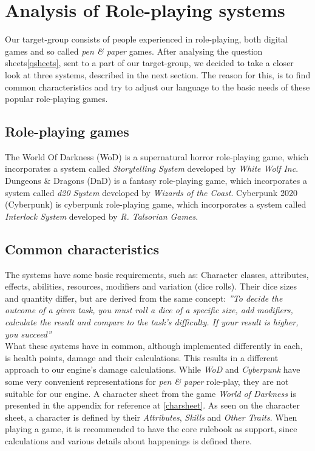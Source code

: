 \section{Analysis of Role-playing systems}
Our target-group consists of people experienced in role-playing, both digital games and so called \emph{pen \& paper} games.	After analysing the question sheets\vref{qsheets}, sent to a part of our target-group, we decided to take a closer look at three systems, described in the next section. The reason for this, is to find common characteristics and try to adjust our language to the basic needs of these popular role-playing games.

\subsection*{Role-playing games}
The World Of Darkness (WoD) is a supernatural horror role-playing game, which incorporates a system called \emph{Storytelling System} developed by \emph{White Wolf Inc}.\cite{wod}
Dungeons \& Dragons (DnD) is a fantasy role-playing game, which incorporates a system called \emph{d20 System} developed by \emph{Wizards of the Coast}.\cite{dnd}
Cyberpunk 2020 (Cyberpunk) is cyberpunk role-playing game, which incorporates a system called \emph{Interlock System} developed by \emph{R. Talsorian Games}.\cite{cyberpunk}

\subsection*{Common characteristics}
\label{baseclasses}
The systems have some basic requirements, such as:
Character classes, attributes, effects, abilities, resources, modifiers and variation (dice rolls).
Their dice sizes and quantity differ, but are derived from the same concept: \textit{''To decide the outcome of a given task, you must roll a dice of a specific size, add modifiers, calculate the result and compare to the task's difficulty. If your result is higher, you succeed''}\\

What these systems have in common, although implemented differently in each, is health points, damage and their calculations. This results in a different approach to our engine's damage calculations. While \emph{WoD} and \emph{Cyberpunk} have some very convenient representations for \emph{pen \& paper} role-play, they are not suitable for our engine. A character sheet from the game \emph{World of Darkness} is presented in the appendix for reference at \vref{charsheet}. As seen on the character sheet, a character is defined by their \emph{Attributes}, \emph{Skills} and \emph{Other Traits}. When playing a game, it is recommended to have the core rulebook as support, since calculations and various details about happenings is defined there.
